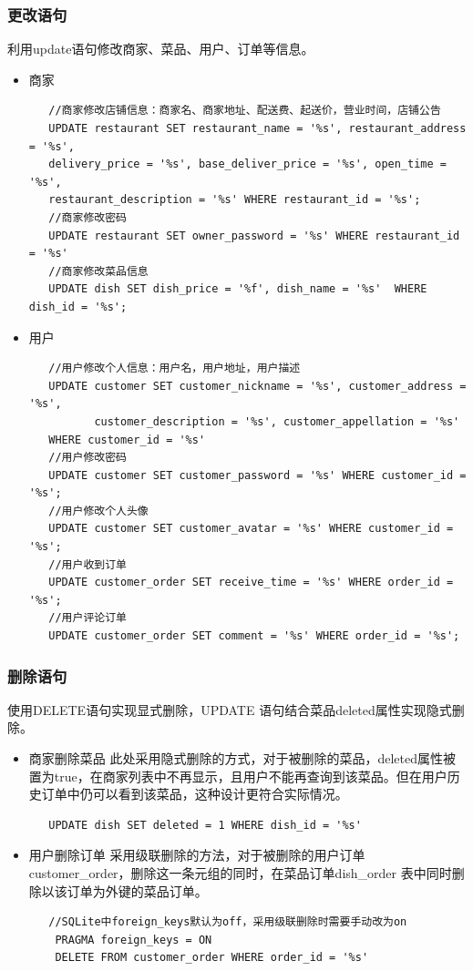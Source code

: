 \documentclass[12pt, oneside,a4paper]{article}
\begin{document}
\subsubsection{更改语句}
   利用update语句修改商家、菜品、用户、订单等信息。
  \begin{itemize}
   \item 商家
   \begin{lstlisting}
   //商家修改店铺信息：商家名、商家地址、配送费、起送价，营业时间，店铺公告
   UPDATE restaurant SET restaurant_name = '%s', restaurant_address = '%s',
   delivery_price = '%s', base_deliver_price = '%s', open_time = '%s',
   restaurant_description = '%s' WHERE restaurant_id = '%s';
   //商家修改密码
   UPDATE restaurant SET owner_password = '%s' WHERE restaurant_id = '%s'
   //商家修改菜品信息
   UPDATE dish SET dish_price = '%f', dish_name = '%s'  WHERE dish_id = '%s';
   \end{lstlisting}
   \item 用户
   \begin{lstlisting}
   //用户修改个人信息：用户名，用户地址，用户描述
   UPDATE customer SET customer_nickname = '%s', customer_address = '%s',
          customer_description = '%s', customer_appellation = '%s'
   WHERE customer_id = '%s'
   //用户修改密码
   UPDATE customer SET customer_password = '%s' WHERE customer_id = '%s';
   //用户修改个人头像
   UPDATE customer SET customer_avatar = '%s' WHERE customer_id = '%s';
   //用户收到订单
   UPDATE customer_order SET receive_time = '%s' WHERE order_id = '%s';
   //用户评论订单
   UPDATE customer_order SET comment = '%s' WHERE order_id = '%s';
   \end{lstlisting}
  \end{itemize}

\subsubsection{删除语句}
    使用DELETE语句实现显式删除，UPDATE 语句结合菜品deleted属性实现隐式删除。
   \begin{itemize}
    \item 商家删除菜品
      此处采用隐式删除的方式，对于被删除的菜品，deleted属性被置为true，在商家列表中不再显示，且用户不能再查询到该菜品。但在用户历史订单中仍可以看到该菜品，这种设计更符合实际情况。
       \begin{lstlisting}
   UPDATE dish SET deleted = 1 WHERE dish_id = '%s'
       \end{lstlisting}
    \item 用户删除订单
      采用级联删除的方法，对于被删除的用户订单customer\_order，删除这一条元组的同时，在菜品订单dish\_order 表中同时删除以该订单为外键的菜品订单。
       \begin{lstlisting}
   //SQLite中foreign_keys默认为off，采用级联删除时需要手动改为on
	PRAGMA foreign_keys = ON
	DELETE FROM customer_order WHERE order_id = '%s'
        \end{lstlisting}
   \end{itemize}
\end{document}
